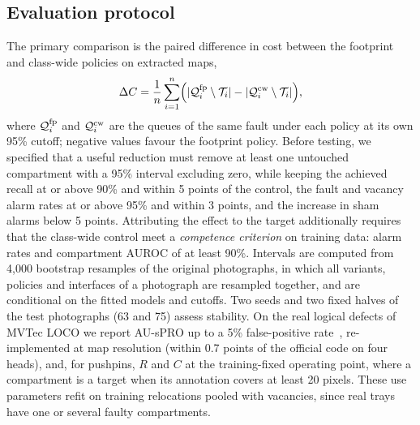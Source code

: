 \subsection{Evaluation protocol}
\label{sec:protocol}
The primary comparison is the paired difference in cost between the footprint and class-wide policies on extracted maps,
\begin{equation}
 \Delta C=\frac{1}{n}\sum_{i=1}^{n}\Bigl(|\mathcal{Q}_i^{\text{fp}}\setminus\mathcal{T}_i|-|\mathcal{Q}_i^{\text{cw}}\setminus\mathcal{T}_i|\Bigr),
 \label{eq:delta}
\end{equation}
where $\mathcal{Q}_i^{\text{fp}}$ and $\mathcal{Q}_i^{\text{cw}}$ are the queues of the same fault under each policy at its own 95\% cutoff; negative values favour the footprint policy. Before testing, we specified that a useful reduction must remove at least one untouched compartment with a 95\% interval excluding zero, while keeping the achieved recall at or above 90\% and within 5 points of the control, the fault and vacancy alarm rates at or above 95\% and within 3 points, and the increase in sham alarms below 5 points. Attributing the effect to the target additionally requires that the class-wide control meet a \emph{competence criterion} on training data: alarm rates and compartment AUROC of at least 90\%. Intervals are computed from 4,000 bootstrap resamples of the original photographs, in which all variants, policies and interfaces of a photograph are resampled together, and are conditional on the fitted models and cutoffs. Two seeds and two fixed halves of the test photographs (63 and 75) assess stability. On the real logical defects of MVTec LOCO we report AU-sPRO up to a 5\% false-positive rate~\cite{bergmann2022}, re-implemented at map resolution (within 0.7 points of the official code on four heads), and, for pushpins, $R$ and $C$ at the training-fixed operating point, where a compartment is a target when its annotation covers at least 20 pixels. These use parameters refit on training relocations pooled with vacancies, since real trays have one or several faulty compartments.
